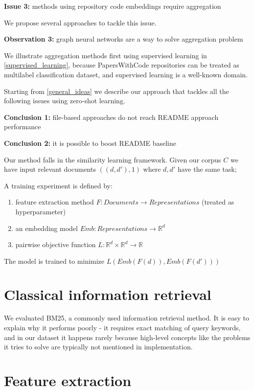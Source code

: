 \documentclass[longabstract,mgr,english]{iithesis}
\begin{document}
\textbf{Issue 3:}\label{feature_aggregation} methods using repository code embeddings require aggregation

We propose several approaches to tackle this issue.

\textbf{Observation 3:} graph neural networks are a way to solve aggregation problem

We illustrate aggregation methods first using supervised learning in \ref{supervised_learning}, because PapersWithCode
repositories can be treated as multilabel classification dataset, and supervised
learning is a well-known domain.

Starting from \ref{general_ideas} we describe our approach that tackles all
the following issues using zero-shot learning.

\textbf{Conclusion 1:} file-based approaches do not reach README approach performance

\textbf{Conclusion 2:} it is possible to boost README baseline


Our method falls in the similarity learning framework. Given our corpus $C$ we have input relevant documents $((d, d'), 1)$ where $d, d'$ have the same task;

A training experiment is defined by:
\begin{enumerate}
    \item feature extraction method $F: \textit{Documents} \to \textit{Representations}$ (treated as hyperparameter)
    \item an embedding model $Emb: \textit{Representations} \to \mathbb{R}^d$
    \item pairwise objective function $L: \mathbb{R}^d \times \mathbb{R}^d \to \mathbb{R}$
\end{enumerate}

The model is trained to minimize $L(Emb(F(d)), Emb(F(d')))$

\section{Classical information retrieval}
\label{classical_ir}
We evaluated BM25, a commonly used information retrieval method. It is easy to
explain why it performs poorly - it requires exact matching of query keywords,
and in our dataset it happens rarely because high-level concepts like the
problems it tries to solve are typically not mentioned in implementation.

\section{Feature extraction}
\label{approach_feature_extraction}
\end{document}
